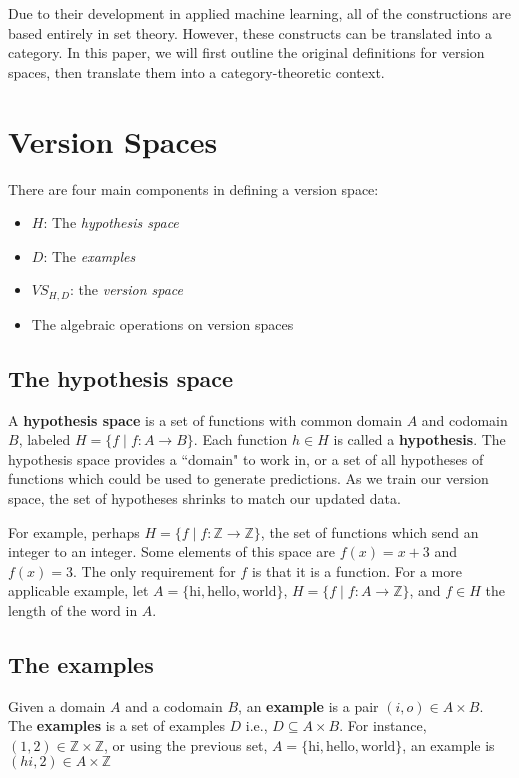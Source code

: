 \documentclass{article}
\theoremstyle{definition}
\begin{document}
Due to their development in applied machine learning, all of the constructions are based entirely in set theory. However, these constructs can be translated into a category. In this paper, we will first outline the original definitions for version spaces, then translate them into a category-theoretic context. 

\section{Version Spaces}
There are four main components in defining a version space: 
\begin{itemize}
    \item $H$: The \textit{hypothesis space}
    \item $D$: The \textit{examples}
    \item $VS_{H,D}$: the \textit{version space}
    \item The algebraic operations on version spaces
\end{itemize}


\subsection{The hypothesis space}

A \textbf{hypothesis space} is a set of functions with common domain $A$ and codomain $B$, labeled $H = \{f \mid f: A \rightarrow B \}$. Each function $h \in H$ is called a \textbf{hypothesis}.  The hypothesis space provides a ``domain" to work in, or a set of all hypotheses of functions which could be used to generate predictions. As we train our version space, the set of hypotheses shrinks to match our updated data. 

For example, perhaps $H = \{f \mid f: \mathbb{Z} \rightarrow \mathbb{Z}\}$, the set of functions which send an integer to an integer. Some elements of this space are $f(x) = x + 3$ and $f(x) = 3$. The only requirement for $f$ is that it is a function. For a more applicable example, let $A = \{\text{hi}, \text{hello}, \text{world}\}$, $H = \{f \mid f: A\rightarrow \mathbb{Z}\}$, and $f\in H$ the length of the word in $A$. 

\subsection{The examples}
Given a domain $A$ and a codomain $B$, an \textbf{example} is a pair $(i, o)\in A \times B$. The \textbf{examples} is a set of examples $D$ i.e., $D \subseteq A \times B$. For instance, $(1,2) \in \mathbb{Z} \times \mathbb{Z}$, or using the previous set, $A = \{\text{hi}, \text{hello}, \text{world}\}$, an example is $(hi, 2) \in A \times \mathbb{Z}$
\end{document}
